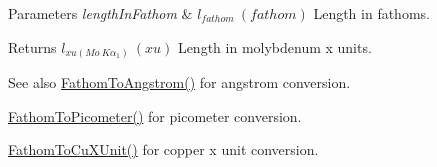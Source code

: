 \begin{DoxyParams}{Parameters}
{\em length\+In\+Fathom} & $ l_{fathom}\ (fathom)$ Length in fathoms. \\
\hline
\end{DoxyParams}
\begin{DoxyReturn}{Returns}
$ l_{xu(Mo\ K\alpha_1)}\ (xu)$ Length in molybdenum x units. 
\end{DoxyReturn}
\begin{DoxySeeAlso}{See also}
\mbox{\hyperlink{group___e_g_x_math-_conversions-_length_conversions-_imperial-_fathom-_non-_s_i_gac03859840078c2a19cbf1f79bcf2b919}{Fathom\+To\+Angstrom()}} for angstrom conversion. 

\mbox{\hyperlink{group___e_g_x_math-_conversions-_length_conversions-_imperial-_fathom-_s_i_gad5fe5d3a1a48420dc43cd2826a9b6f71}{Fathom\+To\+Picometer()}} for picometer conversion. 

\mbox{\hyperlink{group___e_g_x_math-_conversions-_length_conversions-_imperial-_fathom-_non-_s_i_ga6692d3fad4af03d78145e34bf0a6c2ac}{Fathom\+To\+Cu\+X\+Unit()}} for copper x unit conversion. 
\end{DoxySeeAlso}
